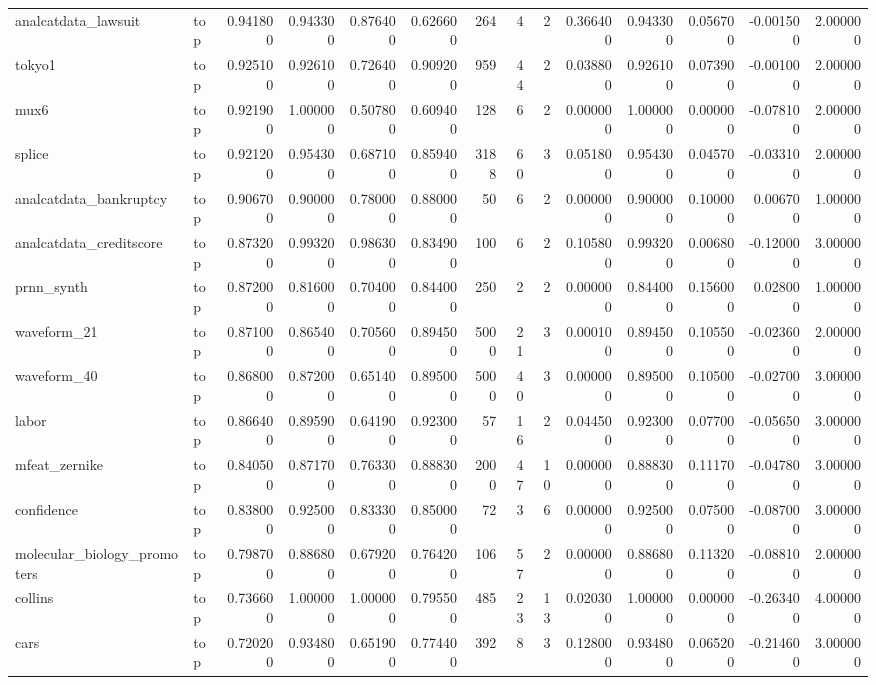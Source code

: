 \begin{longtable}{llrrrrrrrrrrrr}
analcatdata\_lawsuit & top & 0.941800 & 0.943300 & 0.876400 & 0.626600 & 264 & 4 & 2 & 0.366400 & 0.943300 & 0.056700 & -0.001500 & 2.000000 \\
tokyo1 & top & 0.925100 & 0.926100 & 0.726400 & 0.909200 & 959 & 44 & 2 & 0.038800 & 0.926100 & 0.073900 & -0.001000 & 2.000000 \\
mux6 & top & 0.921900 & 1.000000 & 0.507800 & 0.609400 & 128 & 6 & 2 & 0.000000 & 1.000000 & 0.000000 & -0.078100 & 2.000000 \\
splice & top & 0.921200 & 0.954300 & 0.687100 & 0.859400 & 3188 & 60 & 3 & 0.051800 & 0.954300 & 0.045700 & -0.033100 & 2.000000 \\
analcatdata\_bankruptcy & top & 0.906700 & 0.900000 & 0.780000 & 0.880000 & 50 & 6 & 2 & 0.000000 & 0.900000 & 0.100000 & 0.006700 & 1.000000 \\
analcatdata\_creditscore & top & 0.873200 & 0.993200 & 0.986300 & 0.834900 & 100 & 6 & 2 & 0.105800 & 0.993200 & 0.006800 & -0.120000 & 3.000000 \\
prnn\_synth & top & 0.872000 & 0.816000 & 0.704000 & 0.844000 & 250 & 2 & 2 & 0.000000 & 0.844000 & 0.156000 & 0.028000 & 1.000000 \\
waveform\_21 & top & 0.871000 & 0.865400 & 0.705600 & 0.894500 & 5000 & 21 & 3 & 0.000100 & 0.894500 & 0.105500 & -0.023600 & 2.000000 \\
waveform\_40 & top & 0.868000 & 0.872000 & 0.651400 & 0.895000 & 5000 & 40 & 3 & 0.000000 & 0.895000 & 0.105000 & -0.027000 & 3.000000 \\
labor & top & 0.866400 & 0.895900 & 0.641900 & 0.923000 & 57 & 16 & 2 & 0.044500 & 0.923000 & 0.077000 & -0.056500 & 3.000000 \\
mfeat\_zernike & top & 0.840500 & 0.871700 & 0.763300 & 0.888300 & 2000 & 47 & 10 & 0.000000 & 0.888300 & 0.111700 & -0.047800 & 3.000000 \\
confidence & top & 0.838000 & 0.925000 & 0.833300 & 0.850000 & 72 & 3 & 6 & 0.000000 & 0.925000 & 0.075000 & -0.087000 & 3.000000 \\
molecular\_biology\_promoters & top & 0.798700 & 0.886800 & 0.679200 & 0.764200 & 106 & 57 & 2 & 0.000000 & 0.886800 & 0.113200 & -0.088100 & 2.000000 \\
collins & top & 0.736600 & 1.000000 & 1.000000 & 0.795500 & 485 & 23 & 13 & 0.020300 & 1.000000 & 0.000000 & -0.263400 & 4.000000 \\
cars & top & 0.720200 & 0.934800 & 0.651900 & 0.774400 & 392 & 8 & 3 & 0.128000 & 0.934800 & 0.065200 & -0.214600 & 3.000000 \\
\end{longtable}
